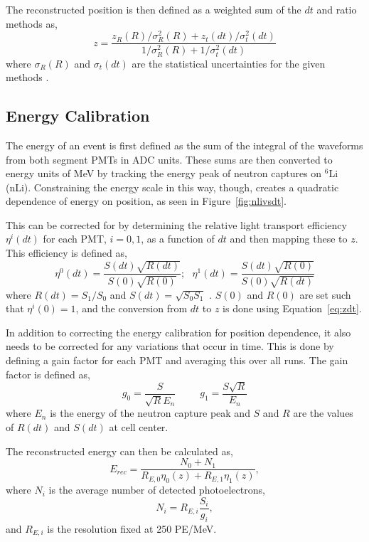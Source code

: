 The reconstructed position is then defined as a weighted sum of the $dt$ and ratio methods as, 
\begin{equation}
	z = \frac{z_R(R)/\sigma_R^2(R) + z_t(dt)/\sigma_t^2(dt)}{1/\sigma_R^2(R) + 1/\sigma_t^2(dt)}
\end{equation}
where $\sigma_R(R)$ and $\sigma_t(dt)$ are the statistical uncertainties for the given methods \cite{MM:1131}. 



\subsection{Energy Calibration}

The energy of an event is first defined as the sum of the integral of the waveforms from both segment PMTs in ADC units. 
These sums are then converted to energy units of MeV by tracking the energy peak of neutron captures on $^6$Li (nLi). 
Constraining the energy scale in this way, though, creates a quadratic dependence of energy on position, as seen in Figure~\ref{fig:nlivsdt}.

This can be corrected for by determining the relative light transport efficiency $\eta^i(dt)$  for each PMT, $i = 0,1$, as a function of $dt$ and then mapping these to $z$.
This efficiency is defined as, 
\begin{equation}
	\eta^0(dt) = \frac{S(dt)\sqrt{R(dt)}}{S(0)\sqrt{R(0)}};~~~ \eta^1(dt) = \frac{S(dt)\sqrt{R(0)}}{S(0)\sqrt{R(dt)}}
\end{equation}
where $R(dt) = S_1/S_0$ and $S(dt) = \sqrt{S_0S_1}$ \cite{MM:2314}. 
$S(0)$ and $R(0)$ are set such that $\eta^i(0) = 1$, and the conversion from $dt$ to $z$ is done using Equation~\ref{eq:zdt}.

In addition to correcting the energy calibration for position dependence, it also needs to be corrected for any variations that occur in time.
This is done by defining a gain factor for each PMT and averaging this over all runs.
The gain factor is defined as,
\begin{equation}
g_0 = \frac{S}{\sqrt{R}E_n} ~~~~~~~~~~~ g_1 = \frac{S\sqrt{R}}{E_n}
\end{equation}
where $E_n$ is the energy of the neutron capture peak and $S$ and $R$ are the values of $R(dt)$ and $S(dt)$ at cell center.

The reconstructed energy can then be calculated as,
\begin{equation}
	E_{rec} = \frac{N_0 + N_1}{{R_{E,0}}{\eta_0(z)} + {R_{E,1}}{\eta_1(z)}},
\end{equation}
where $N_i$ is the average number of detected photoelectrons,
\begin{equation}
	N_i = R_{E,i}\frac{S_i}{g_i},
\end{equation}
and $R_{E,i}$ is the resolution fixed at 250 PE/MeV. 

